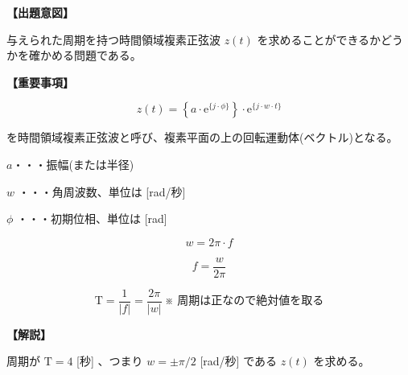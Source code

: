 \noindent \textbf{【出題意図】}

\bigskip
\noindent 与えられた周期を持つ時間領域複素正弦波 $z(t)$ を求めることができるかどうかを確かめる問題である。

\vspace{1em}
\noindent \textbf{【重要事項】}

\[
z(t) =  \left \{ a \cdot \textrm{e}^{\{j \cdot \phi\}} \right \} 
\cdot \textrm{e}^{\{j \cdot w \cdot t \}}
\]

\bigskip
\noindent を時間領域複素正弦波と呼び、複素平面の上の回転運動体(ベクトル)となる。

\bigskip
\noindent\quad  $a$・・・振幅(または半径)

\bigskip
\noindent\quad $w$ ・・・角周波数、単位は [rad/秒]

\bigskip
\noindent\quad $\phi$ ・・・初期位相、単位は [rad]

\[
w = 2\pi \cdot f
\]

\[
f = \frac{w}{2\pi} 
\]

\[
\textrm{T} = \frac{1}{|f|} = \frac{2\pi}{|w|}   \ \mbox{※ 周期は正なので絶対値を取る}
\]

\bigskip

\vspace{1em}
\noindent \textbf{【解説】}

\bigskip
\noindent 周期が $\textrm{T} = 4$ [秒] 、つまり $w = \pm\pi/2$ [rad/秒] である $z(t)$ を求める。
